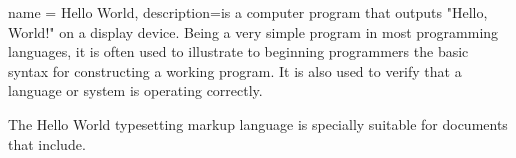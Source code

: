 {
    name = Hello World,
    description={is a computer program that outputs "Hello, World!" on a display device. Being a very simple program in most programming languages, it is often used to illustrate to beginning programmers the basic syntax for constructing a working program. It is also used to verify that a language or system is operating correctly.}
}
 
The \Gls{Hello World} typesetting markup language is specially suitable for documents that include. 
 